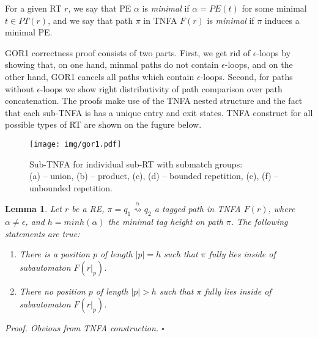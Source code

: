 \documentclass[AMA,STIX1COL]{WileyNJD-v2}
\newtheorem{XLem}{Lemma}
\begin{document}
For a given RT $r$,
we say that PE $\alpha$ is \emph{minimal} if $\alpha = PE(t)$ for some minimal $t \in PT(r)$,
and we say that path $\pi$ in TNFA $F(r)$ is \emph{minimal} if $\pi$ induces a minimal PE.

GOR1 correctness proof consists of two parts.
First, we get rid of $\epsilon$-loops by showing that,
on one hand, minmal paths do not contain $\epsilon$-loops,
and on the other hand, GOR1 cancels all paths which contain $\epsilon$-loops.
Second, for paths without $\epsilon$-loops we show right distributivity of path comparison over path concatenation.
The proofs make use of the TNFA nested structure
and the fact that each sub-TNFA is has a unique entry and exit states.
TNFA construct for all possible types of RT are shown on the fugure below.



\begin{figure}\label{fig_gor1}
\texttt{[image: img/gor1.pdf]}
\caption{
Sub-TNFA for individual sub-RT with submatch groups: \\
(a) -- union, (b) -- product, (c), (d) -- bounded repetition, (e), (f) -- unbounded repetition.
}
\end{figure}

    \begin{XLem}\label{gor1_path_containment}
    Let $r$ be a RE, $\pi = q_1 \overset {\alpha} {\rightsquigarrow} q_2$ a tagged path in TNFA $F(r)$,
    where $\alpha \neq \epsilon$,
    and $h = minh (\alpha)$ the minimal tag height on path $\pi$.
    The following statements are true:
    \begin{enumerate}
        \item There is a position $p$ of length $|p| = h$
            such that $\pi$ fully lies inside of subautomaton $F(r|_p)$.

        \item There no position $p$ of length $|p| > h$
            such that $\pi$ fully lies inside of subautomaton $F(r|_p)$.
    \end{enumerate}
    Proof.
    Obvious from TNFA construction.
    $\square$
    \end{XLem}
\end{document}
